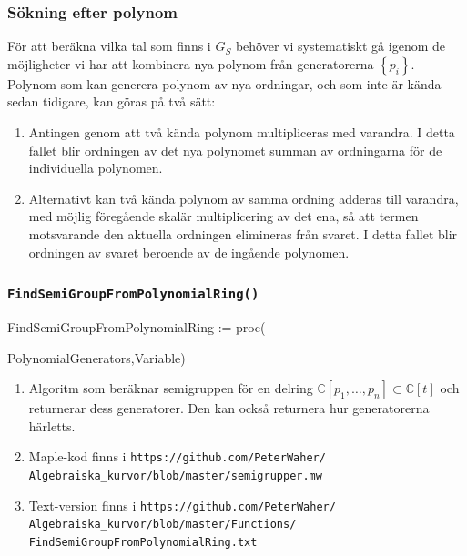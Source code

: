 \documentclass{beamer}
\begin{document}
\begin{frame}
	\frametitle{Sökning efter polynom}
För att beräkna vilka tal som finns i $G_S$ behöver vi systematiskt gå igenom de möjligheter vi har att kombinera nya polynom från generatorerna $\left\{p_i\right\}$. Polynom som kan generera polynom av nya ordningar, och som inte är kända sedan tidigare, kan göras på två sätt:

\begin{enumerate}
	\item<2-> Antingen genom att två kända polynom multipliceras med varandra. I detta fallet blir ordningen av det nya polynomet summan av ordningarna för de individuella polynomen.
	
	\item<3-> Alternativt kan två kända polynom av samma ordning adderas till varandra, med möjlig föregående skalär multiplicering av det ena, så att termen motsvarande den aktuella ordningen elimineras från svaret. I detta fallet blir ordningen av svaret beroende av de ingående polynomen.
\end{enumerate}
\end{frame}

\begin{frame}
	\frametitle{\texttt{FindSemiGroupFromPolynomialRing()}}
	
	\begin{semiverbatim}
		FindSemiGroupFromPolynomialRing := proc( 

		\qquad PolynomialGenerators,Variable)
	\end{semiverbatim}
	
	\begin{enumerate}
		\item<1-> Algoritm som beräknar semigruppen för en delring $\mathbb{C}[p_1,\ldots,p_n] \subset \mathbb{C}[t]$ och returnerar dess generatorer. Den kan också returnera hur generatorerna härletts.
		
		\item<2-> Maple-kod finns i \texttt{https://github.com/PeterWaher/\\
			\qquad Algebraiska\_kurvor/blob/master/semigrupper.mw}
		
		\item<3-> Text-version finns i
		\texttt{https://github.com/PeterWaher/\\
			\qquad Algebraiska\_kurvor/blob/master/Functions/\\
			\qquad FindSemiGroupFromPolynomialRing.txt} 
	\end{enumerate}
\end{frame}
\end{document}
